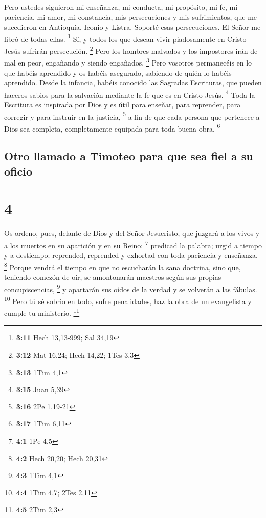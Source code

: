  Pero ustedes siguieron mi enseñanza, mi conducta, mi
propósito, mi fe, mi paciencia, mi amor, mi constancia, 
mis persecuciones y mis sufrimientos, que me sucedieron en Antioquía,
Iconio y Listra. Soporté esas persecuciones. El Señor me libró de todas
ellas. \footnote{\textbf{3:11} Hech 13,13-999; Sal 34,19}
 Sí, y todos los que desean vivir piadosamente en Cristo
Jesús sufrirán persecución. \footnote{\textbf{3:12} Mat 16,24; Hech
  14,22; 1Tes 3,3}  Pero los hombres malvados y los
impostores irán de mal en peor, engañando y siendo engañados.
\footnote{\textbf{3:13} 1Tim 4,1}  Pero vosotros
permanecéis en lo que habéis aprendido y os habéis asegurado, sabiendo
de quién lo habéis aprendido.  Desde la infancia, habéis
conocido las Sagradas Escrituras, que pueden haceros sabios para la
salvación mediante la fe que es en Cristo Jesús. \footnote{\textbf{3:15}
  Juan 5,39}  Toda la Escritura es inspirada por Dios y
es útil para enseñar, para reprender, para corregir y para instruir en
la justicia, \footnote{\textbf{3:16} 2Pe 1,19-21}  a fin
de que cada persona que pertenece a Dios sea completa, completamente
equipada para toda buena obra. \footnote{\textbf{3:17} 1Tim 6,11}

\hypertarget{otro-llamado-a-timoteo-para-que-sea-fiel-a-su-oficio}{%
\subsection{Otro llamado a Timoteo para que sea fiel a su
oficio}\label{otro-llamado-a-timoteo-para-que-sea-fiel-a-su-oficio}}

\hypertarget{section-3}{%
\section{4}\label{section-3}}

 Os ordeno, pues, delante de Dios y del Señor Jesucristo,
que juzgará a los vivos y a los muertos en su aparición y en su Reino:
\footnote{\textbf{4:1} 1Pe 4,5}  predicad la palabra;
urgid a tiempo y a destiempo; reprended, reprended y exhortad con toda
paciencia y enseñanza. \footnote{\textbf{4:2} Hech 20,20; Hech 20,31}
 Porque vendrá el tiempo en que no escucharán la sana
doctrina, sino que, teniendo comezón de oír, se amontonarán maestros
según sus propias concupiscencias, \footnote{\textbf{4:3} 1Tim 4,1}
 y apartarán sus oídos de la verdad y se volverán a las
fábulas. \footnote{\textbf{4:4} 1Tim 4,7; 2Tes 2,11}  Pero
tú sé sobrio en todo, sufre penalidades, haz la obra de un evangelista y
cumple tu ministerio. \footnote{\textbf{4:5} 2Tim 2,3}

